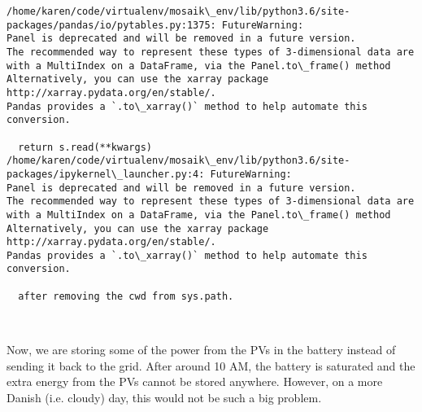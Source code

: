 \documentclass[11pt]{article}
\begin{document}
    \begin{Verbatim}[commandchars=\\\{\}]
/home/karen/code/virtualenv/mosaik\_env/lib/python3.6/site-packages/pandas/io/pytables.py:1375: FutureWarning: 
Panel is deprecated and will be removed in a future version.
The recommended way to represent these types of 3-dimensional data are with a MultiIndex on a DataFrame, via the Panel.to\_frame() method
Alternatively, you can use the xarray package http://xarray.pydata.org/en/stable/.
Pandas provides a `.to\_xarray()` method to help automate this conversion.

  return s.read(**kwargs)
/home/karen/code/virtualenv/mosaik\_env/lib/python3.6/site-packages/ipykernel\_launcher.py:4: FutureWarning: 
Panel is deprecated and will be removed in a future version.
The recommended way to represent these types of 3-dimensional data are with a MultiIndex on a DataFrame, via the Panel.to\_frame() method
Alternatively, you can use the xarray package http://xarray.pydata.org/en/stable/.
Pandas provides a `.to\_xarray()` method to help automate this conversion.

  after removing the cwd from sys.path.

    \end{Verbatim}

    \begin{center}
    \end{center}
    { \hspace*{\fill} \\}
    
    Now, we are storing some of the power from the PVs in the battery
instead of sending it back to the grid. After around 10 AM, the battery
is saturated and the extra energy from the PVs cannot be stored
anywhere. However, on a more Danish (i.e. cloudy) day, this would not be
such a big problem.


    
    
    
    
\end{document}
